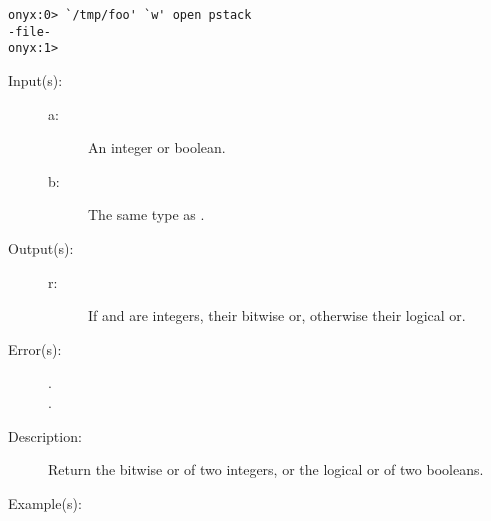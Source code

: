 \begin{description}
\begin{description}
\begin{verbatim}
onyx:0> `/tmp/foo' `w' open pstack
-file-
onyx:1>
		\end{verbatim}
	\end{description}
\label{systemdict:or}
\item[{\onyxop{a b}{or}{r}}: ]
	\begin{description}\item[]
	\item[Input(s): ]
		\begin{description}\item[]
		\item[a: ]
			An integer or boolean.
		\item[b: ]
			The same type as .
		\end{description}
	\item[Output(s): ]
		\begin{description}\item[]
		\item[r: ]
			If  and  are integers, their bitwise
			or, otherwise their logical or.
		\end{description}
	\item[Error(s): ]
		\begin{description}\item[]
		\item[.]
		\item[.]
		\end{description}
	\item[Description: ]
		Return the bitwise or of two integers, or the logical or of
		two booleans.
	\item[Example(s): ]\begin{verbatim}


\end{verbatim}
\end{description}
\end{description}
